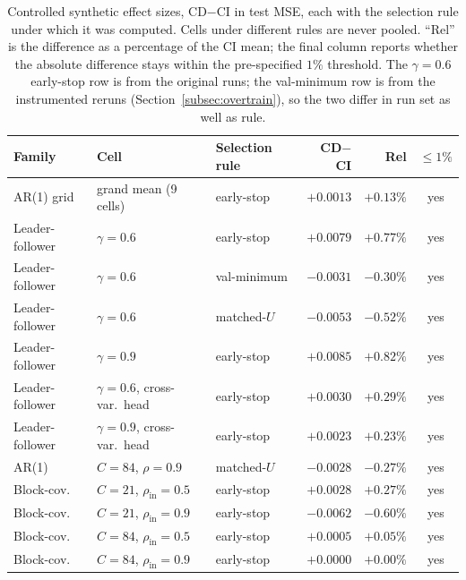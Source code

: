 \documentclass[10pt]{article} %
\begin{document}
    \begin{table}[htbp]
        \centering
        \caption{Controlled synthetic effect sizes, CD$-$CI in test MSE, each with the selection rule under which it was
        computed. Cells under different rules are never pooled. ``Rel'' is the difference as a percentage of the
        CI mean; the final column reports whether the absolute difference stays within the pre-specified $1\%$
            threshold. The $\gamma = 0.6$ early-stop row is from the original runs; the val-minimum row is from the
            instrumented reruns (Section~\ref{subsec:overtrain}), so the two differ in run set as well as rule.}
        \label{tab:equiv}
        \small
        \setlength{\tabcolsep}{3pt}
        \begin{tabular}{lllrr c}
            \toprule
            Family          & Cell                               & Selection rule & CD$-$CI   & Rel       & $\le 1\%$ \\
            \midrule
            AR(1) grid      & grand mean (9 cells)               & early-stop     & $+0.0013$ & $+0.13\%$ & yes       \\
            \midrule
            Leader-follower & $\gamma = 0.6$                     & early-stop     & $+0.0079$ & $+0.77\%$ & yes       \\
            Leader-follower & $\gamma = 0.6$                     & val-minimum    & $-0.0031$ & $-0.30\%$ & yes       \\
            Leader-follower & $\gamma = 0.6$                     & matched-$U$    & $-0.0053$ & $-0.52\%$ & yes       \\
            Leader-follower & $\gamma = 0.9$                     & early-stop     & $+0.0085$ & $+0.82\%$ & yes       \\
            Leader-follower & $\gamma = 0.6$, cross-var.\ head   & early-stop     & $+0.0030$ & $+0.29\%$ & yes       \\
            Leader-follower & $\gamma = 0.9$, cross-var.\ head   & early-stop     & $+0.0023$ & $+0.23\%$ & yes       \\
            \midrule
            AR(1)           & $C{=}84$, $\rho{=}0.9$             & matched-$U$    & $-0.0028$ & $-0.27\%$ & yes       \\
            Block-cov.      & $C{=}21$, $\rho_{\text{in}}{=}0.5$ & early-stop     & $+0.0028$ & $+0.27\%$ & yes       \\
            Block-cov.      & $C{=}21$, $\rho_{\text{in}}{=}0.9$ & early-stop     & $-0.0062$ & $-0.60\%$ & yes       \\
            Block-cov.      & $C{=}84$, $\rho_{\text{in}}{=}0.5$ & early-stop     & $+0.0005$ & $+0.05\%$ & yes       \\
            Block-cov.      & $C{=}84$, $\rho_{\text{in}}{=}0.9$ & early-stop     & $+0.0000$ & $+0.00\%$ & yes       \\
            \bottomrule
        \end{tabular}
    \end{table}
\end{document}

